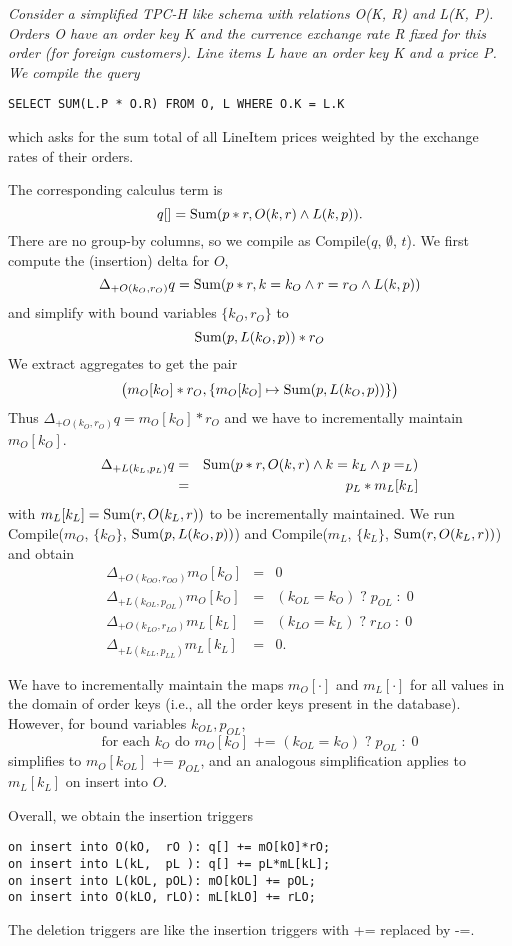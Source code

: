 \begin{example}\em
Consider a simplified TPC-H like schema with relations O(K, R)
and L(K, P). Orders O have an order key K and the currence exchange rate R fixed for this order (for
foreign customers). Line items L have an {\em order} key
K and a price P. We compile the query
\begin{verbatim}
SELECT SUM(L.P * O.R) FROM O, L WHERE O.K = L.K
\end{verbatim}
which asks for the sum total of all LineItem prices weighted by the exchange
rates of their orders.

The corresponding calculus term is
\[
q[] = \mbox{Sum}(p*r, O(k, r) \land L(k, p)).
\]
There are no group-by columns, so we compile as Compile($q$, $\emptyset$, $t$).
We first compute the (insertion) delta for $O$,
\[
\Delta_{+O(k_{O}, r_{O})} q =
\mbox{Sum}(p*r, k=k_{O} \land r=r_{O} \land L(k, p))
\]
and simplify with bound variables $\{k_{O}, r_{O}\}$ to
\[
\mbox{Sum}(p, L(k_{O}, p))*r_{O}
\]
We extract aggregates to get the pair
\[
\big( m_O[k_{O}]*r_{O},
\{ m_O[k_{O}] \mapsto \mbox{Sum}(p, L(k_{O}, p)) \} \big)
\]
Thus $\Delta_{+O(k_{O}, r_{O})} q = m_O[k_{O}]*r_{O}$
and we have to incrementally maintain $m_O[k_O]$.
\begin{eqnarray*}
\Delta_{+L(k_{L}, p_{L})} q &=&
   \mbox{Sum}(p*r, O(k, r) \land k=k_{L} \land p=_{L}) \\
&=& p_{L} * m_L[k_{L}]
\end{eqnarray*}
with $m_L[k_{L}] = \mbox{Sum}(r, O(k_{L}, r))$ to be incrementally maintained.
We run Compile($m_O$, $\{k_{O}\}$, $\mbox{Sum}(p, L(k_{O}, p))$)
and Compile($m_L$, $\{k_{L}\}$, $\mbox{Sum}(r, O(k_{L}, r))$) and obtain
\begin{eqnarray*}
\Delta_{+O(k_{OO}, r_{OO})} m_O[k_O] &=& 0 \\
\Delta_{+L(k_{OL}, p_{OL})} m_O[k_O] &=& (k_{OL} = k_O) \;?\; p_{OL} \;:\; 0 \\
\Delta_{+O(k_{LO}, r_{LO})} m_L[k_L] &=& (k_{LO} = k_L) \;?\; r_{LO} \;:\; 0 \\
\Delta_{+L(k_{LL}, p_{LL})} m_L[k_L] &=& 0.
\end{eqnarray*}

We have to incrementally maintain the maps $m_O[\cdot]$ and
$m_L[\cdot]$ for all values in the domain of order keys (i.e., all the order
keys present in the database). However, for bound variables
$k_{OL}, p_{OL}$,
\[
\mbox{for each $k_O$ do $m_O[k_O]$ += $(k_{OL} = k_O) \;?\; p_{OL} \;:\; 0$}
\]
simplifies to $m_O[k_{OL}]$ += $p_{OL}$,
and an analogous simplification applies to $m_L[k_L]$ on insert into $O$.

Overall, we obtain the insertion triggers
\begin{verbatim}
on insert into O(kO,  rO ): q[] += mO[kO]*rO;
on insert into L(kL,  pL ): q[] += pL*mL[kL];
on insert into L(kOL, pOL): mO[kOL] += pOL;
on insert into O(kLO, rLO): mL[kLO] += rLO;
\end{verbatim}
The deletion triggers are like the insertion triggers with += replaced by -=.
\punto
\end{example}




%
%


